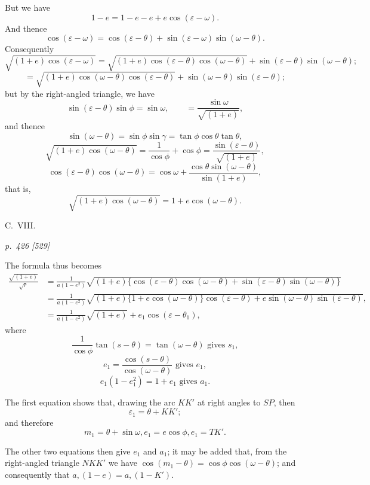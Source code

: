 \documentclass[11pt,a4paper]{article}
\theoremstyle{plain}
\theoremstyle{definition}
\begin{document}
But we have
\[
1 - e = 1 - e - e + e\cos(\varepsilon - \omega).
\]
And thence
\[
\cos(\varepsilon - \omega) = \cos(\varepsilon - \theta) + \sin(\varepsilon - \omega)\sin(\omega - \theta).
\]
Consequently
\[
\sqrt{(1 + e)\cos(\varepsilon - \omega)} = \sqrt{(1 + e)\cos(\varepsilon - \theta)\cos(\omega - \theta)} + \sin(\varepsilon - \theta)\sin(\omega - \theta);
\]
\[
= \sqrt{(1 + e)\cos(\omega - \theta)\cos(\varepsilon - \theta)} + \sin(\omega - \theta)\sin(\varepsilon - \theta);
\]
but by the right-angled triangle, we have
\[
\sin(\varepsilon - \theta)\sin\phi = \sin\omega, \qquad = \frac{\sin\omega}{\sqrt{(1 + e)}},
\]
and thence
\[
\sin(\omega - \theta) = \sin\phi\sin\gamma = \tan\phi\cos\theta\tan\theta,
\]
\[
\sqrt{(1 + e)\cos(\omega - \theta)} = \frac{1}{\cos\phi} + \cos\phi = \frac{\sin(\varepsilon - \theta)}{\sqrt{(1 + e)}},
\]
\[
\cos(\varepsilon - \theta)\cos(\omega - \theta) = \cos\omega + \frac{\cos\theta\sin(\omega - \theta)}{\sin(1 + e)},
\]
that is,
\[
\sqrt{(1 + e)\cos(\omega - \theta)} = 1 + e\cos(\omega - \theta).
\]

\bigskip
\hfill{\small C.\ VIII.}

\clearpage

\bigskip
\textit{p.~426 [529]}
\smallskip

The formula thus becomes
\begin{align*}
\frac{\sqrt{(1 + e)}}{\sqrt{r}} &= \frac{1}{a(1 - e^2)}\sqrt{(1 + e)\{\cos(\varepsilon - \theta)\cos(\omega - \theta) + \sin(\varepsilon - \theta)\sin(\omega - \theta)\}}\\
&= \frac{1}{a(1 - e^2)}\sqrt{(1 + e)\{1 + e\cos(\omega - \theta)\}\cos(\varepsilon - \theta) + e\sin(\omega - \theta)\sin(\varepsilon - \theta)},\\
&= \frac{1}{a(1 - e^2)}\sqrt{(1 + e)} + e_1\cos(\varepsilon - \theta_1),
\end{align*}
where
\[
\frac{1}{\cos\phi}\tan(s - \theta) = \tan(\omega - \theta)\text{ gives } s_1,
\]
\[
e_1 = \frac{\cos(s - \theta)}{\cos(\omega - \theta)}\text{ gives } e_1,
\]
\[
e_1(1 - e_1^2) = 1 + e_1\text{ gives } a_1.
\]

The first equation shows that, drawing the arc $KK'$ at right angles to $SP$, then
\[
\varepsilon_1 = \theta + KK';
\]
and therefore
\[
m_1 = \theta + \sin\omega, e_1 = e\cos\phi, e_1 = TK'.
\]

The other two equations then give $e_1$ and $a_1$; it may be added that, from the
right-angled triangle $NKK'$ we have $\cos(m_1 - \theta) = \cos\phi\cos(\omega - \theta)$; and consequently
that $a, (1 - e) = a, (1 - K')$.
\end{document}
